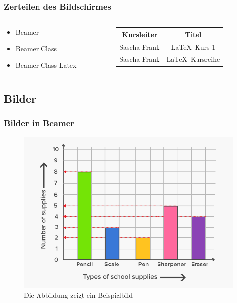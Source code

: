 \documentclass[compress,aspectratio=169]{beamer} %
\begin{document}
	\begin{frame}
		\frametitle{Zerteilen des Bildschirmes}
		\begin{columns}
			\begin{column}{6cm}
				\begin{itemize}
					\item Beamer 
					\item Beamer Class 
					\item Beamer Class Latex 
				\end{itemize}
			\end{column}
			\begin{column}{6cm}
				\begin{tabular}{|c|c|}
					\hline
					\textbf{Kursleiter} & \textbf{Titel} \\
					\hline
					Sascha Frank &  \LaTeX \ Kurs 1 \\
					\hline
					Sascha Frank & \LaTeX \ Kursreihe \\
					\hline
				\end{tabular}
			\end{column}
		\end{columns}
	\end{frame}
	
	\subsection{Bilder} 
	\begin{frame}\frametitle{Bilder in Beamer}
		\begin{figure}
			\includegraphics[scale=0.3]{PIC1} 
			\caption{Die Abbildung zeigt ein Beispielbild}
		\end{figure}
	\end{frame}
	
\end{document}
